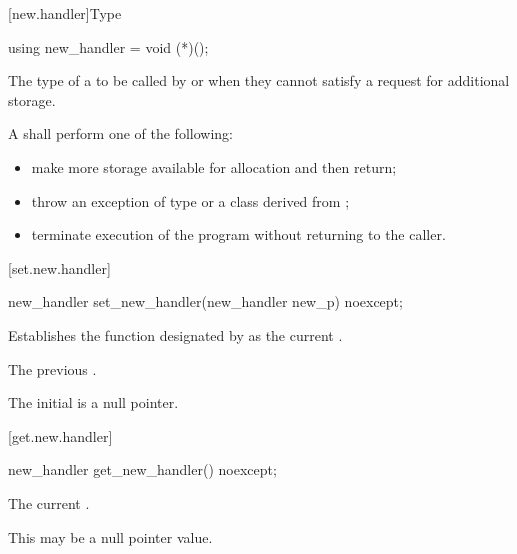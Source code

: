 [new.handler]{Type }

%
\begin{itemdecl}
using new_handler = void (*)();
\end{itemdecl}

\begin{itemdescr}
\pnum
The type of a
to be called by
or
 when they cannot satisfy a request for additional storage.

\pnum
\required
A  shall perform one of the following:

\begin{itemize}
\item
make more storage available for allocation and then return;
\item
throw an exception of type
or a class derived from
%
;
\item
terminate execution of the program without returning to the caller.
%
%
\end{itemize}
\end{itemdescr}

[set.new.handler]{}

%
\begin{itemdecl}
new_handler set_new_handler(new_handler new_p) noexcept;
\end{itemdecl}

\begin{itemdescr}
\pnum
\effects
Establishes the function designated by  as the current
.

\pnum
\returns
The previous .

\pnum
\remarks
The initial  is a null pointer.
\end{itemdescr}

[get.new.handler]{}

%
\begin{itemdecl}
new_handler get_new_handler() noexcept;
\end{itemdecl}

\begin{itemdescr}
\pnum
\returns The current .
\begin{note} This may be a null pointer value. \end{note}
\end{itemdescr}


